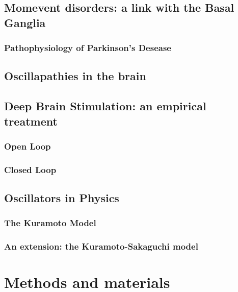 \documentclass[MSc,english]{Container/thesistemplate}
\begin{document}
\newpage
\section{Momevent disorders: a link with the Basal Ganglia}
\subsection{Pathophysiology of Parkinson's Desease}

\newpage
\section{Oscillapathies in the brain}

\newpage
\section{Deep Brain Stimulation: an empirical treatment}
\subsection{Open Loop}
\subsection{Closed Loop}

\newpage
\section{Oscillators in Physics}
\subsection{The Kuramoto Model}
\subsection{An extension: the Kuramoto-Sakaguchi model}

\newpage
\chapter{Methods and materials}




\end{document}
